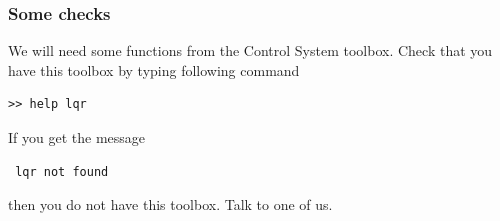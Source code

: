 \documentclass[11pt,xcolor=svgnames,onlymath]{beamer}
\begin{document}
\begin{frame}
\begin{enumerate}
\begin{itemize}
\end{itemize}

\end{enumerate}
\end{frame}
\begin{frame}[fragile]
\frametitle{Some checks}
We will need some functions from the Control System toolbox. Check that you have this toolbox by typing following command
\begin{lstlisting}
>> help lqr
\end{lstlisting}
If you get the message
\begin{lstlisting}
 lqr not found
\end{lstlisting}
then you do not have this toolbox. Talk to one of us.

\end{frame}
\end{document}
